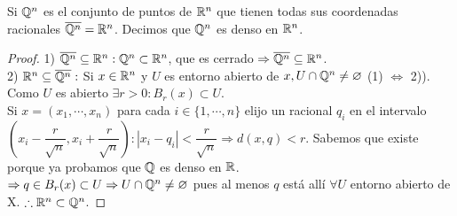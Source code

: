 \begin{eg}
  Si $\mathbb{Q}^n$ es el conjunto de puntos de $\mathbb{R}^n$ que tienen todas sus coordenadas racionales $\overline{\mathbb{Q}^n} = \mathbb{R}^n$. Decimos que $\mathbb{Q}^n$ es denso en $\mathbb{R}^n$.

  \begin{proof}
    1) $\overline{\mathbb{Q}^n} \subseteq \mathbb{R}^n : \mathbb{Q}^n \subset \mathbb{R}^n$, que es cerrado $\Rightarrow \overline{\mathbb{Q}^n} \subseteq \mathbb{R}^n$. \\
    2) $\mathbb{R}^n \subseteq \overline{\mathbb{Q}^n}:$ Si $x \in \mathbb{R}^n$ y $U$ es entorno abierto de $x, U \cap \mathbb{Q}^n \neq \varnothing$ (1) $\iff$ 2)). Como $U$ es abierto $\exists r > 0 : B_r(x) \subset U$. \\
    Si $x = (x_1, \cdots, x_n)$ para cada $i \in \{1, \cdots, n\}$ elijo un racional $q_i$ en el intervalo $(x_i - \dfrac{r}{\sqrt{n}}, x_i + \dfrac{r}{\sqrt{n}}) : |x_i - q_i| < \dfrac{r}{\sqrt{n}} \Rightarrow d(x, q) < r$. Sabemos que existe porque ya probamos que $\mathbb{Q}$ es denso en $\mathbb{R}$. \\
    $\Rightarrow q \in B_r(x) \subset U \Rightarrow U \cap \mathbb{Q}^n \neq \varnothing$ pues al menos $q$ está allí $\forall U$ entorno abierto de X.
    $\therefore \mathbb{R}^n \subset \mathbb{Q}^n$.
  \end{proof}
\end{eg}